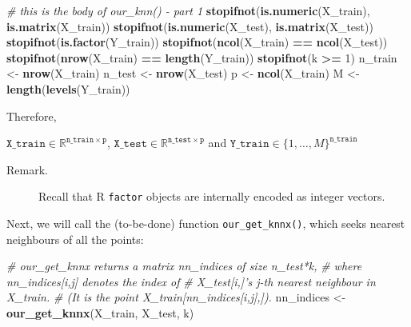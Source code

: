 \documentclass[10pt,b5paper,krantz1]{krantz}
\newenvironment{Shaded}{\begin{snugshade}}{\end{snugshade}}
\newcommand{\CommentTok}[1]{\textcolor[rgb]{0.37,0.37,0.37}{\textit{#1}}}
\newcommand{\DecValTok}[1]{\textcolor[rgb]{0.06,0.06,0.06}{#1}}
\newcommand{\KeywordTok}[1]{\textcolor[rgb]{0.27,0.27,0.27}{\textbf{#1}}}
\newcommand{\NormalTok}[1]{#1}
\newcommand{\OperatorTok}[1]{\textcolor[rgb]{0.43,0.43,0.43}{\textbf{#1}}}
\newcommand{\StringTok}[1]{\textcolor[rgb]{0.5,0.5,0.5}{#1}}
\begin{document}
\begin{Shaded}
\begin{Highlighting}[]
\CommentTok{# this is the body of our_knn() - part 1}
\KeywordTok{stopifnot}\NormalTok{(}\KeywordTok{is.numeric}\NormalTok{(X_train), }\KeywordTok{is.matrix}\NormalTok{(X_train))}
\KeywordTok{stopifnot}\NormalTok{(}\KeywordTok{is.numeric}\NormalTok{(X_test), }\KeywordTok{is.matrix}\NormalTok{(X_test))}
\KeywordTok{stopifnot}\NormalTok{(}\KeywordTok{is.factor}\NormalTok{(Y_train))}
\KeywordTok{stopifnot}\NormalTok{(}\KeywordTok{ncol}\NormalTok{(X_train) }\OperatorTok{==}\StringTok{ }\KeywordTok{ncol}\NormalTok{(X_test))}
\KeywordTok{stopifnot}\NormalTok{(}\KeywordTok{nrow}\NormalTok{(X_train) }\OperatorTok{==}\StringTok{ }\KeywordTok{length}\NormalTok{(Y_train))}
\KeywordTok{stopifnot}\NormalTok{(k }\OperatorTok{>=}\StringTok{ }\DecValTok{1}\NormalTok{)}
\NormalTok{n_train <-}\StringTok{ }\KeywordTok{nrow}\NormalTok{(X_train)}
\NormalTok{n_test  <-}\StringTok{ }\KeywordTok{nrow}\NormalTok{(X_test)}
\NormalTok{p <-}\StringTok{ }\KeywordTok{ncol}\NormalTok{(X_train)}
\NormalTok{M <-}\StringTok{ }\KeywordTok{length}\NormalTok{(}\KeywordTok{levels}\NormalTok{(Y_train))}
\end{Highlighting}
\end{Shaded}

Therefore,

\(\mathtt{X\_train}\in\mathbb{R}^{\mathtt{n\_train}\times \mathtt{p}}\),
\(\mathtt{X\_test}\in\mathbb{R}^{\mathtt{n\_test}\times \mathtt{p}}\) and
\(\mathtt{Y\_train}\in\{1,\dots,M\}^{\mathtt{n\_train}}\)

\begin{description}
\item[Remark.]
Recall that R \texttt{factor} objects are internally encoded as integer vectors.
\end{description}

Next, we will call the (to-be-done) function \texttt{our\_get\_knnx()},
which seeks nearest neighbours of all the points:

\begin{Shaded}
\begin{Highlighting}[]
\CommentTok{# our_get_knnx returns a matrix nn_indices of size n_test*k,}
\CommentTok{# where nn_indices[i,j] denotes the index of}
\CommentTok{# X_test[i,]'s j-th nearest neighbour in X_train.}
\CommentTok{# (It is the point X_train[nn_indices[i,j],]).}
\NormalTok{nn_indices <-}\StringTok{ }\KeywordTok{our_get_knnx}\NormalTok{(X_train, X_test, k)}
\end{Highlighting}
\end{Shaded}
\end{document}
